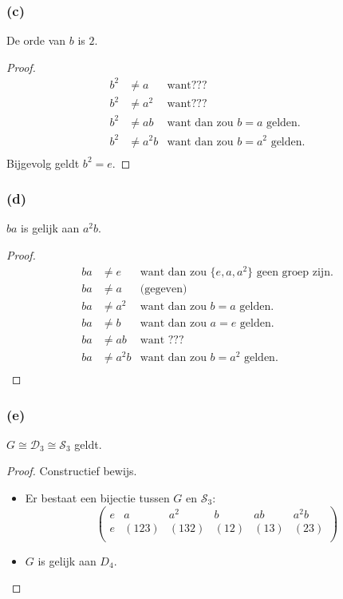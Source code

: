 \documentclass[main.tex]{subfiles}
\begin{document}
\subsubsection{(c)}
De orde van $b$ is $2$.

\begin{proof}
  \[
  \begin{array}{rll}
    b^{2} &\neq a &\text{want} ???\\ 
    b^{2} &\neq a^{2} &\text{want} ??? \\ 
    b^{2} &\neq ab &\text{want dan zou } b=a \text{ gelden.} \\ 
    b^{2} &\neq a^{2}b &\text{want dan zou } b=a^{2} \text{ gelden.} \\ 
  \end{array}
  \]
  Bijgevolg geldt $b^{2} = e$.
\end{proof}


\subsubsection{(d)}
$ba$ is gelijk aan $a^{2}b$.

\begin{proof}
  \[
  \begin{array}{rll}
    ba &\neq e &\text{want dan zou } \{ e,a,a^{2} \} \text{ geen groep zijn.}\\ 
    ba &\neq a &\text{(gegeven)}\\ 
    ba &\neq a^{2} &\text{want dan zou } b=a \text{ gelden.} \\ 
    ba &\neq b &\text{want dan zou } a=e \text{ gelden.} \\ 
    ba &\neq ab &\text{want ???} \\ 
    ba &\neq a^{2}b &\text{want dan zou } b=a^{2} \text{ gelden.} \\ 
  \end{array}
  \]
\end{proof}

\subsubsection{(e)}
$G \cong \mathcal{D}_{3} \cong \mathcal{S}_{3}$ geldt.

\begin{proof}
  Constructief bewijs.
  \begin{itemize}
  \item Er bestaat een bijectie tussen $G$ en $\mathcal{S}_{3}$:
    \[
    \begin{pmatrix}
      e & a     & a^{2} & b    & ab   & a^{2}b\\
      e & (123) & (132) & (12) & (13) & (23)\\
    \end{pmatrix}
    \]
  \item $G$ is gelijk aan $D_{4}$.
  \end{itemize}
\end{proof}
\end{document}
